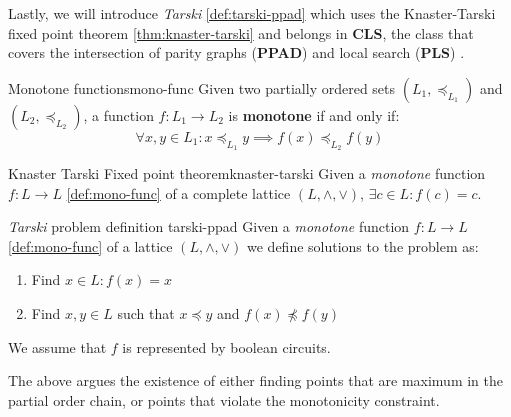 Lastly, we will introduce \textit{Tarski} \ref{def:tarski-ppad}
which uses the Knaster-Tarski fixed point theorem \ref{thm:knaster-tarski} and
belongs in \textbf{CLS}, the class that covers the intersection
of parity graphs (\textbf{PPAD}) and local search (\textbf{PLS})
\cite{papadimitriou_ComplexityParityArgument_1994,johnson_HowEasyLocal_1988,fearnley_ComplexityGradientDescent_2021}.

\begin{definitionbox}{Monotone functions}{mono-func}
    Given two partially ordered sets $(L_1, \preceq_{L_1})$ and $(L_2, \preceq_{L_2})$, a function
    $f: L_1 \to L_2$ is \textbf{monotone} if and only if:
    $$
        \forall x,y \in L_1: x \preceq_{L_1} y \implies f(x) \preceq_{L_2} f(y)
    $$
\end{definitionbox}
%     
%
\begin{theorembox}{Knaster Tarski Fixed point theorem\cite{bronislaw_TheoremeFunctionsDensembles_1928, fearnley_FasterAlgorithmFinding_2022}}{knaster-tarski}
    Given a \textit{monotone} function $f: L \to L$ \ref{def:mono-func} of a complete lattice $(L, \wedge, \vee)$,  $\exists c \in L: f(c) = c$.
\end{theorembox}

\begin{definitionbox}{\textit{Tarski} problem definition \cite{fearnley_FasterAlgorithmFinding_2022}}{tarski-ppad}
    Given a \textit{monotone} function $f: L \to L$ \ref{def:mono-func} of a lattice $(L, \wedge, \vee)$
    we define solutions to the problem as:
    \begin{enumerate}
        \item Find $x \in L: f(x) = x$
        \item Find $x,y \in L$ such that $x \preceq y$ and $f(x) \not\preceq f(y)$
    \end{enumerate}
    We assume that $f$ is represented by boolean circuits.
\end{definitionbox}

The above argues the existence of either finding points that are maximum
in the partial order chain, or points that violate the monotonicity constraint.




